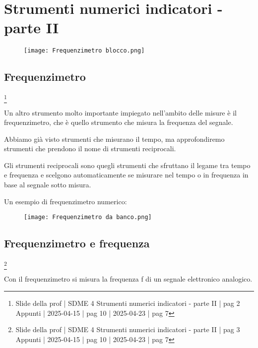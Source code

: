 \chapter{Strumenti numerici indicatori - parte II}

\begin{figure}[h]
    \centering
    \texttt{[image: Frequenzimetro blocco.png]}
\end{figure}

\newpage 

\section{Frequenzimetro}
\footnote{Slide della prof | SDME 4 Strumenti numerici indicatori - parte II | pag 2 \\  
Appunti | 2025-04-15 | pag 10 | 2025-04-23 | pag 7}

Un altro strumento molto importante impiegato nell'ambito delle misure è il frequenzimetro, 
che è quello strumento che misura la frequenza del segnale. \newline 

Abbiamo già visto strumenti che misurano il tempo, ma approfondiremo strumenti che prendono il nome di strumenti reciprocali. \newline 

Gli strumenti reciprocali sono quegli strumenti che sfruttano il legame tra tempo e frequenza e scelgono automaticamente 
se misurare nel tempo o in frequenza in base al segnale sotto misura. \newline 

Un esempio di frequenzimetro numerico: 

\begin{figure}[h]
    \centering
    \texttt{[image: Frequenzimetro da banco.png]}
\end{figure}

\newpage 

\section{Frequenzimetro e frequenza}
\footnote{Slide della prof | SDME 4 Strumenti numerici indicatori - parte II | pag 3 \\  
Appunti | 2025-04-15 | pag 10 | 2025-04-23 | pag 7}

Con il frequenzimetro si misura la frequenza f di un segnale elettronico analogico. \newline 

